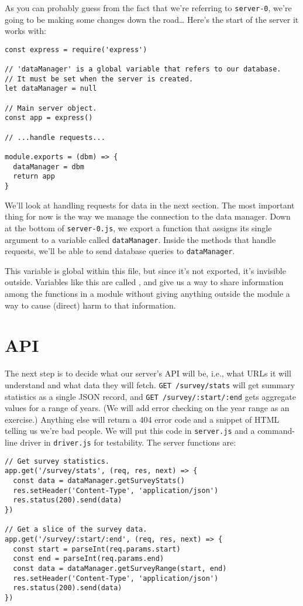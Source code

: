 \noindent
As you can probably guess from the fact that we're referring to \texttt{server-0},
we're going to be making some changes down the road{\ldots}
Here's the start of the server it works with:

\begin{verbatim}
const express = require('express')

// 'dataManager' is a global variable that refers to our database.
// It must be set when the server is created.
let dataManager = null

// Main server object.
const app = express()

// ...handle requests...

module.exports = (dbm) => {
  dataManager = dbm
  return app
}
\end{verbatim}

We'll look at handling requests for data in the next section.
The most important thing for now is the way we manage the connection to the data manager.
Down at the bottom of \texttt{server-0.js},
we export a function that assigns its single argument to a variable called \texttt{dataManager}.
Inside the methods that handle requests,
we'll be able to send database queries to \texttt{dataManager}.

This variable is global within this file,
but since it's not exported,
it's invisible outside.
Variables like this are called ,
and give us a way to share information among the functions in a module
without giving anything outside the module a way to cause (direct) harm to that information.

\section{API}\label{s:capstone-api}

The next step is to decide what our server's API will be,
i.e.,
what URLs it will understand and what data they will fetch.
\texttt{GET /survey/stats} will get summary statistics as a single JSON record,
and \texttt{GET /survey/:start/:end} gets aggregate values for a range of years.
(We will add error checking on the year range as an exercise.)
Anything else will return a 404 error code and a snippet of HTML telling us we're bad people.
We will put this code in \texttt{server.js} and a command-line driver in \texttt{driver.js} for testability.
The server functions are:

\begin{verbatim}
// Get survey statistics.
app.get('/survey/stats', (req, res, next) => {
  const data = dataManager.getSurveyStats()
  res.setHeader('Content-Type', 'application/json')
  res.status(200).send(data)
})

// Get a slice of the survey data.
app.get('/survey/:start/:end', (req, res, next) => {
  const start = parseInt(req.params.start)
  const end = parseInt(req.params.end)
  const data = dataManager.getSurveyRange(start, end)
  res.setHeader('Content-Type', 'application/json')
  res.status(200).send(data)
})
\end{verbatim}

